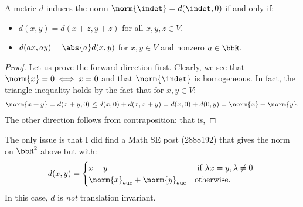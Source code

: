 \documentclass{article}
\begin{document}
\begin{theorem}
  A metric $d$ induces the norm $\norm{\indet} = d(\indet, 0)$ if and only if:
  \begin{itemize}
    \item $d(x, y) = d(x + z, y + z)$ for all $x, y, z \in V$.
    \item $d(ax, ay) = \abs{a}d(x, y)$ for $x,y \in V$ and nonzero $a \in \bbR$.
  \end{itemize}
\end{theorem}
\begin{proof}
  Let us prove the forward direction first.
  Clearly, we see that $\norm{x} = 0 \iff x = 0$ and that $\norm{\indet}$ is homogeneous.
  In fact, the triangle inequality holds by the fact that for $x, y \in V$:
  \begin{align*}
    \norm{x + y} = d(x + y, 0) \le d(x, 0) + d(x, x + y) = d(x, 0) + d(0, y) = \norm{x} + \norm{y}.
  \end{align*}
  The other direction follows from contraposition: that is,
\end{proof}

The only issue is that I did find a Math SE post (2888192) that gives the norm on $\bbR^{2}$ above but with:
\[ d(x, y) = \begin{cases}
  x - y & \textrm{ if } \lambda x = y, \lambda \ne 0.\\
  \norm{x}_{\textrm{euc}} + \norm{y}_{\textrm{euc}} & \text{otherwise}.
\end{cases} \]
In this case, $d$ is \emph{not} translation invariant.
\end{document}
